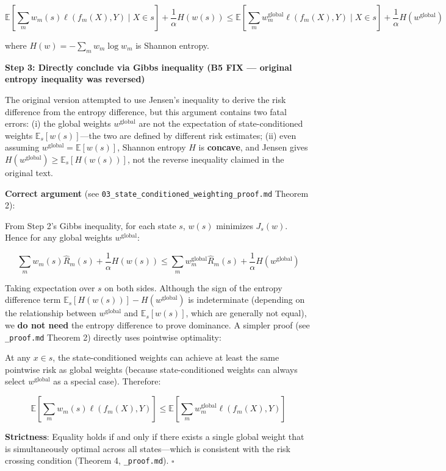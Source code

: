 \documentclass[
  12pt,
]{article}
\begin{document}
\[\mathbb{E}\left[\sum_m w_m(s) \ell(f_m(X), Y) \mid X \in s\right] + \frac{1}{\alpha} H(w(s)) \leq \mathbb{E}\left[\sum_m w_m^{\text{global}} \ell(f_m(X), Y) \mid X \in s\right] + \frac{1}{\alpha} H(w^{\text{global}})\]

where \(H(w) = -\sum_m w_m \log w_m\) is Shannon entropy.

\textbf{Step 3: Directly conclude via Gibbs inequality (B5 FIX --- original entropy inequality was reversed)}

The original version attempted to use Jensen's inequality to derive the risk difference from the entropy difference, but this argument contains two fatal errors: (i) the global weights
\(w^{\text{global}}\) are not the expectation of state-conditioned weights
\(\mathbb{E}_s[w(s)]\)---the two are defined by different risk estimates; (ii) even assuming
\(w^{\text{global}} = \mathbb{E}[w(s)]\), Shannon entropy \(H\)
is \textbf{concave}, and Jensen gives
\(H(w^{\text{global}}) \geq \mathbb{E}_s[H(w(s))]\), not the reverse inequality claimed in the original text.

\textbf{Correct argument} (see
\texttt{03\_state\_conditioned\_weighting\_proof.md} Theorem 2):

From Step 2's Gibbs inequality, for each state \(s\), \(w(s)\) minimizes
\(J_s(w)\). Hence for any global weights \(w^{\text{global}}\):

\[\sum_m w_m(s) \hat{R}_m(s) + \frac{1}{\alpha} H(w(s)) \leq \sum_m w_m^{\text{global}} \hat{R}_m(s) + \frac{1}{\alpha} H(w^{\text{global}})\]

Taking expectation over \(s\) on both sides. Although the sign of the entropy difference term
\(\mathbb{E}_s[H(w(s))] - H(w^{\text{global}})\) is indeterminate (depending on
the relationship between \(w^{\text{global}}\) and \(\mathbb{E}_s[w(s)]\),
which are generally not equal), we \textbf{do not need} the entropy difference to prove dominance. A simpler proof (see
\texttt{\_proof.md} Theorem 2) directly uses pointwise optimality:

At any \(x \in s\), the state-conditioned weights can achieve at least the same pointwise risk as global weights (because state-conditioned weights can always select \(w^{\text{global}}\) as a special case). Therefore:

\[\mathbb{E}\left[\sum_m w_m(s) \ell(f_m(X), Y) \right] \leq \mathbb{E}\left[\sum_m w_m^{\text{global}} \ell(f_m(X), Y) \right]\]

\textbf{Strictness}: Equality holds if and only if there exists a single global weight that is simultaneously optimal across all states---which is consistent with the risk crossing condition (Theorem 4, \texttt{\_proof.md}). \(\square\)
\end{document}
